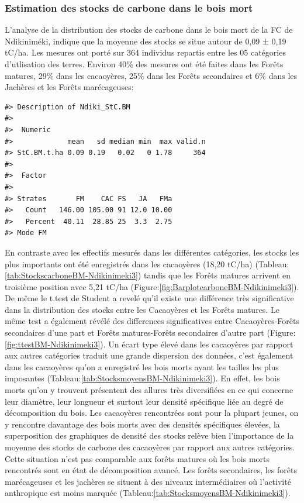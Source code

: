 \documentclass[
  12pt,
  a4paper,
  extrafontsizes,
  onecolumn,
  openright]{book}
\theoremstyle{definition}
\theoremstyle{definition}
\theoremstyle{definition}
\theoremstyle{definition}
\theoremstyle{remark}
\begin{document}
\hypertarget{estimation-des-stocks-de-carbone-dans-le-bois-mort}{%
\subsubsection{Estimation des stocks de carbone dans le bois mort}\label{estimation-des-stocks-de-carbone-dans-le-bois-mort}}

L'analyse de la distribution des stocks de carbone dans le bois mort de la FC de Ndikiniméki, indique que la moyenne des stocks se situe autour de 0,09 ± 0,19 tC/ha. Les mesures ont porté sur 364 individus repartis entre les 05 catégories d'utlisation des terres. Environ 40\% des mesures ont été faites dans les Forêts matures, 29\% dans les cacaoyères, 25\% dans les Forêts secondaires et 6\% dans les Jachères et les Forêts marécageuses:

\begin{verbatim}
#> Description of Ndiki_StC.BM
#> 
#>  Numeric 
#>             mean   sd median min  max valid.n
#> StC.BM.t.ha 0.09 0.19   0.02   0 1.78     364
#> 
#>  Factor 
#>          
#> Strates       FM    CAC FS   JA   FMa
#>   Count   146.00 105.00 91 12.0 10.00
#>   Percent  40.11  28.85 25  3.3  2.75
#> Mode FM
\end{verbatim}

En contraste avec les effectifs mesurés dans les différentes catégories, les stocks les plus importants ont été enregistrés dans les cacaoyères (18,20 tC/ha) (Tableau:\ref{tab:StockscarboneBM-Ndikinimeki3}) tandis que les Forêts matures arrivent en troisième position avec 5,21 tC/ha (Figure:\ref{fig:BarplotcarboneBM-Ndikinimeki3}). De même le t.test de Student a revelé qu'il existe une différence très significative dans la distribution des stocks entre les Cacaoyères et les Forêts matures. Le même test a également révélé des differences significatives entre Cacaoyères-Forêts secondaires d'une part et Forêts matures-Forêts secondaires d'autre part (Figure:\ref{fig:ttestBM-Ndikinimeki3}). Un écart type élevé dans les cacaoyères par rapport aux autres catégories traduit une grande dispersion des données, c'est également dans les cacaoyères qu'on a enregistré les bois morts ayant les tailles les plus imposantes (Tableau:\ref{tab:StocksmoyensBM-Ndikinimeki3}). En effet, les bois morts qu'on y trouvent présentent des allures très diversifiées en ce qui concerne leur diamètre, leur longueur et surtout leur densité spécifique liée au degré de décomposition du bois. Les cacaoyères rencontrées sont pour la plupart jeunes, on y rencontre davantage des bois morts avec des densités spécifiques élevées, la superposition des graphiques de densité des stocks relève bien l'importance de la moyenne des stocks de carbone des cacaoyères par rapport aux autres catégories. Cette situation n'est pas comparable aux forêts matures où les bois morts rencontrés sont en état de décomposition avancé. Les forêts secondaires, les forêts marécageuses et les jachères se situent à des niveaux intermédiaires où l'activité anthropique est moins marquée (Tableau:\ref{tab:StocksmoyensBM-Ndikinimeki3}).
\end{document}
